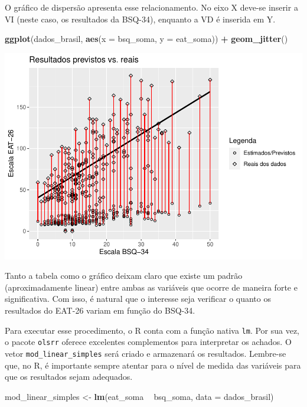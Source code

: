 \documentclass[
]{book}
\newenvironment{Shaded}{\begin{snugshade}}{\end{snugshade}}
\newcommand{\DataTypeTok}[1]{\textcolor[rgb]{0.13,0.29,0.53}{#1}}
\newcommand{\KeywordTok}[1]{\textcolor[rgb]{0.13,0.29,0.53}{\textbf{#1}}}
\newcommand{\NormalTok}[1]{#1}
\newcommand{\OperatorTok}[1]{\textcolor[rgb]{0.81,0.36,0.00}{\textbf{#1}}}
\newcommand{\StringTok}[1]{\textcolor[rgb]{0.31,0.60,0.02}{#1}}
\begin{document}
O gráfico de dispersão apresenta esse relacionamento. No eixo X deve-se inserir a VI (neste caso, os resultados da BSQ-34), enquanto a VD é inserida em Y.

\begin{Shaded}
\begin{Highlighting}[]
\KeywordTok{ggplot}\NormalTok{(dados_brasil, }\KeywordTok{aes}\NormalTok{(}\DataTypeTok{x =}\NormalTok{ bsq_soma, }\DataTypeTok{y =}\NormalTok{ eat_soma)) }\OperatorTok{+}
\StringTok{  }\KeywordTok{geom_jitter}\NormalTok{()}
\end{Highlighting}
\end{Shaded}

\begin{center}\includegraphics{gitbook-demo_files/figure-latex/unnamed-chunk-84-1} \end{center}

Tanto a tabela como o gráfico deixam claro que existe um padrão (aproximadamente linear) entre ambas as variáveis que ocorre de maneira forte e significativa. Com isso, é natural que o interesse seja verificar o quanto os resultados do EAT-26 variam em função do BSQ-34.

Para executar esse procedimento, o R conta com a função nativa \texttt{lm}. Por sua vez, o pacote \texttt{olsrr} oferece excelentes complementos para interpretar os achados. O vetor \texttt{mod\_linear\_simples} será criado e armazenará os resultados. Lembre-se que, no R, é importante sempre atentar para o nível de medida das variáveis para que os resultados sejam adequados.

\begin{Shaded}
\begin{Highlighting}[]
\NormalTok{mod_linear_simples <-}\StringTok{ }\KeywordTok{lm}\NormalTok{(eat_soma }\OperatorTok{~}\StringTok{ }\NormalTok{bsq_soma, }\DataTypeTok{data =}\NormalTok{ dados_brasil)}
\end{Highlighting}
\end{Shaded}
\end{document}
